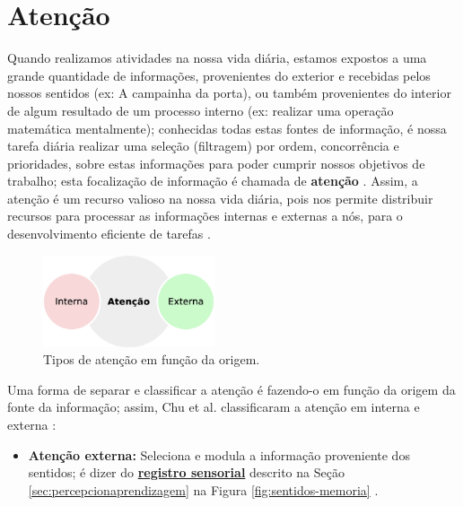 \section{Atenção}
\label{sec:atencao}
Quando realizamos atividades na nossa vida diária, 
estamos expostos a uma grande quantidade de informações, 
provenientes do exterior e recebidas pelos nossos sentidos (ex: A campainha da porta),
ou também provenientes do interior de algum resultado de um processo interno 
(ex: realizar uma operação matemática mentalmente);
conhecidas todas estas fontes de informação,
é nossa tarefa diária realizar uma seleção (filtragem) por ordem, concorrência e prioridades,
sobre estas informações para poder cumprir nossos objetivos de trabalho;
esta focalização de informação é chamada de \textbf{atenção} \cite[pp. 99]{pake2019psicologia}.
Assim, a atenção é um recurso valioso na nossa vida diária, 
pois nos permite distribuir recursos para processar as informações internas e externas
a nós, para o desenvolvimento eficiente de tarefas \cite[pp. 155]{eysenck2017manual}. 

\begin{figure}
  \centering
    \includegraphics[width=0.45\textwidth]{chapters/cap-learning/attention2.eps}
\caption{Tipos de atenção em função da origem.}
\label{fig:attention2}
\end{figure}
Uma forma de separar e classificar  a atenção é fazendo-o
em função da origem da fonte da informação;
assim, Chu et al. classificaram a atenção em interna e externa \cite{ExternalInternalAttention} \cite[pp. 155]{eysenck2017manual}:
\begin{itemize}
\item \textbf{Atenção externa:} 
Seleciona e modula a informação proveniente dos sentidos;
é dizer do \hyperref[sec:percepcionaprendizagem]{\textbf{registro sensorial}}
descrito na Seção \ref{sec:percepcionaprendizagem} na Figura \ref{fig:sentidos-memoria}
\cite{ExternalInternalAttention} \cite[pp. 155]{eysenck2017manual}.
\end{itemize}


